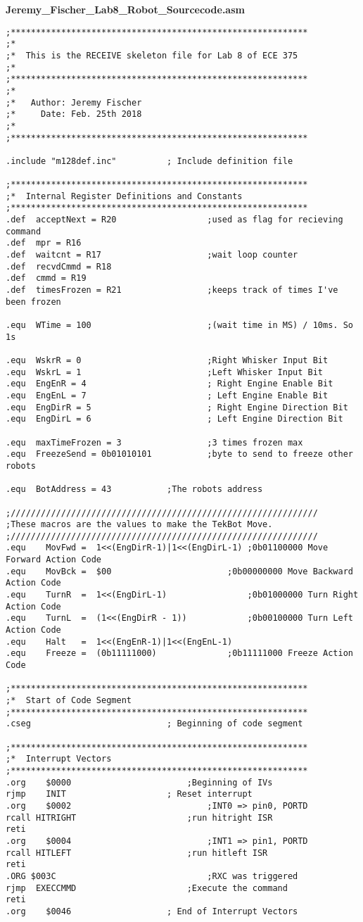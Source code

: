 \documentclass[12pt,letterpaper]{article}
\begin{document}
\clearpage
	\textbf{Jeremy\_Fischer\_Lab8\_Robot\_Sourcecode.asm}
	\begin{verbatim}
;***********************************************************
;*
;*	This is the RECEIVE skeleton file for Lab 8 of ECE 375
;*
;***********************************************************
;*
;*	 Author: Jeremy Fischer
;*	   Date: Feb. 25th 2018
;*
;***********************************************************

.include "m128def.inc"			; Include definition file

;***********************************************************
;*	Internal Register Definitions and Constants
;***********************************************************
.def  acceptNext = R20					;used as flag for recieving command
.def  mpr = R16
.def  waitcnt = R17						;wait loop counter
.def  recvdCmmd = R18
.def  cmmd = R19
.def  timesFrozen = R21 				;keeps track of times I've been frozen

.equ  WTime = 100						;(wait time in MS) / 10ms. So 1s

.equ  WskrR = 0							;Right Whisker Input Bit
.equ  WskrL = 1							;Left Whisker Input Bit
.equ  EngEnR = 4						; Right Engine Enable Bit
.equ  EngEnL = 7						; Left Engine Enable Bit
.equ  EngDirR = 5						; Right Engine Direction Bit
.equ  EngDirL = 6						; Left Engine Direction Bit

.equ  maxTimeFrozen = 3					;3 times frozen max
.equ  FreezeSend = 0b01010101			;byte to send to freeze other robots

.equ  BotAddress = 43			;The robots address

;/////////////////////////////////////////////////////////////
;These macros are the values to make the TekBot Move.
;/////////////////////////////////////////////////////////////
.equ	MovFwd =  1<<(EngDirR-1)|1<<(EngDirL-1)	;0b01100000 Move Forward Action Code
.equ	MovBck =  $00						;0b00000000 Move Backward Action Code
.equ	TurnR  =  1<<(EngDirL-1)				;0b01000000 Turn Right Action Code
.equ	TurnL  =  (1<<(EngDirR - 1))			;0b00100000 Turn Left Action Code
.equ	Halt   =  1<<(EngEnR-1)|1<<(EngEnL-1)	
.equ	Freeze =  (0b11111000)				;0b11111000 Freeze Action Code

;***********************************************************
;*	Start of Code Segment
;***********************************************************
.cseg							; Beginning of code segment

;***********************************************************
;*	Interrupt Vectors
;***********************************************************
.org	$0000						;Beginning of IVs
rjmp 	INIT					; Reset interrupt
.org	$0002							;INT0 => pin0, PORTD
rcall HITRIGHT						;run hitright ISR
reti								
.org	$0004							;INT1 => pin1, PORTD
rcall HITLEFT						;run hitleft ISR
reti								
.ORG $003C								;RXC was triggered
rjmp  EXECCMMD						;Execute the command
reti
.org	$0046					; End of Interrupt Vectors


\end{verbatim}
\end{document}

